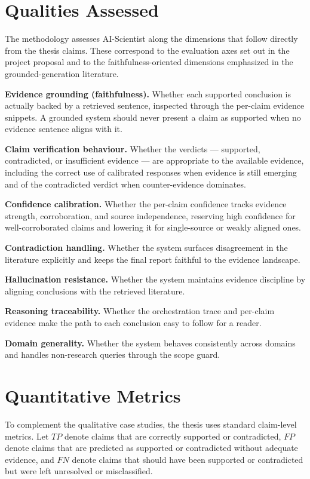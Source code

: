 \section{Qualities Assessed }

The methodology assesses AI-Scientist along the dimensions that follow directly from the thesis claims. These
correspond to the evaluation axes set out in the project proposal and to the faithfulness-oriented dimensions
emphasized in the grounded-generation literature.

\textbf{Evidence grounding (faithfulness).} Whether each supported conclusion is actually backed by a retrieved
sentence, inspected through the per-claim evidence snippets. A grounded system should never present a claim as
supported when no evidence sentence aligns with it.

\textbf{Claim verification behaviour.} Whether the verdicts --- supported, contradicted, or insufficient evidence
--- are appropriate to the available evidence, including the correct use of calibrated responses when evidence is
still emerging and of the contradicted verdict when counter-evidence dominates.

\textbf{Confidence calibration.} Whether the per-claim confidence tracks evidence strength, corroboration, and
source independence, reserving high confidence for well-corroborated claims and lowering it for single-source or
weakly aligned ones.

\textbf{Contradiction handling.} Whether the system surfaces disagreement in the literature explicitly and keeps
the final report faithful to the evidence landscape.

\textbf{Hallucination resistance.} Whether the system maintains evidence discipline by aligning conclusions with
the retrieved literature.

\textbf{Reasoning traceability.} Whether the orchestration trace and per-claim evidence make the path to each
conclusion easy to follow for a reader.

\textbf{Domain generality.} Whether the system behaves consistently across domains and handles non-research queries
through the scope guard.

\section{Quantitative Metrics }

To complement the qualitative case studies, the thesis uses standard claim-level metrics. Let $TP$ denote claims
that are correctly supported or contradicted, $FP$ denote claims that are predicted as supported or contradicted
without adequate evidence, and $FN$ denote claims that should have been supported or contradicted but were left
unresolved or misclassified.

